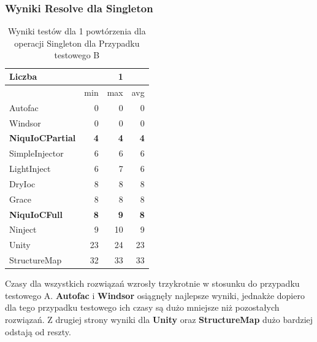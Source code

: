 \documentclass[12pt]{article}
\begin{document}
\subsubsection{Wyniki Resolve dla Singleton}
\begin{table}[H]
\captionsetup{belowskip=0pt,aboveskip=0pt}
\begin{center}
\begin{small}
	\begin{tabular}{ | l | r r r | }
    		\hline
Liczba & & 1 & \\ \hline
 & min & max & avg \\ \hline
Autofac & 0 & 0 & 0 \\ \hline
Windsor & 0 & 0 & 0 \\ \hline
\textbf{NiquIoCPartial} & \textbf{4} & \textbf{4} & \textbf{4} \\ \hline
SimpleInjector & 6 & 6 & 6 \\ \hline
LightInject & 6 & 7 & 6 \\ \hline
DryIoc & 8 & 8 & 8 \\ \hline
Grace & 8 & 8 & 8 \\ \hline
\textbf{NiquIoCFull} & \textbf{8} & \textbf{9} & \textbf{8} \\ \hline
Ninject & 9 & 10 & 9 \\ \hline
Unity & 23 & 24 & 23 \\ \hline
StructureMap & 32 & 33 & 33 \\ \hline
  	\end{tabular}
\end{small}
\end{center}
\caption{Wyniki testów dla 1 powtórzenia dla operacji Singleton dla Przypadku testowego B}
\label{TestCaseB_Singleton1}
\end{table}
Czasy dla wszystkich rozwiązań wzrosły trzykrotnie w stosunku do przypadku testowego A. \textbf{Autofac} i \textbf{Windsor} osiągnęły najlepsze wyniki, jednakże dopiero dla tego przypadku testowego ich czasy są dużo mniejsze niż pozostałych rozwiązań. Z drugiej strony wyniki dla \textbf{Unity} oraz \textbf{StructureMap} dużo bardziej odstają od reszty.
\\ \\
\end{document}
